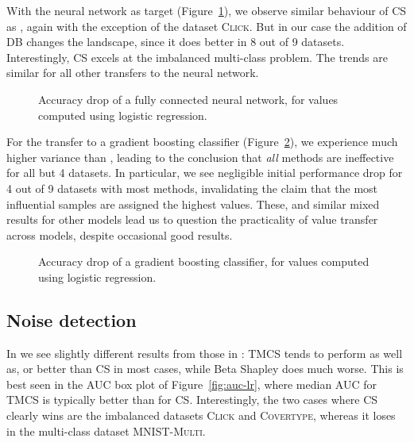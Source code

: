 \documentclass[10pt]{article}
\newcommand{\tmem}[1]{{\em #1\/}}
\newcommand{\tmname}[1]{\textsc{#1}}
\begin{document}
With the neural network as target (Figure~\ref{fig:transfer-lr-mlp}), we
observe similar behaviour of CS as {\cite{schoch_csshapley_2022}}, again with
the exception of the dataset {\tmname{Click}}. But in our case the addition of
DB changes the landscape, since it does better in 8 out of 9 datasets.
Interestingly, CS excels at the imbalanced multi-class problem. The trends are
similar for all other transfers to the neural network.

\begin{figure}[h]
  \caption{\label{fig:transfer-lr-mlp}Accuracy drop of a fully connected
  neural network, for values computed using logistic regression.}
\end{figure}

For the transfer to a gradient boosting classifier
(Figure~\ref{fig:transfer-lr-gb}), we experience much higher variance than
{\cite{schoch_csshapley_2022}}, leading to the conclusion that {\tmem{all}}
methods are ineffective for all but 4 datasets. In particular, we see
negligible initial performance drop for 4 out of 9 datasets with most methods,
invalidating the claim that the most influential samples are assigned the
highest values. These, and similar mixed results for other models lead us to
question the practicality of value transfer across models, despite occasional
good results.

\begin{figure}[h]
  \caption{\label{fig:transfer-lr-gb}Accuracy drop of a gradient boosting
  classifier, for values computed using logistic regression.}
\end{figure}

\subsection{Noise detection}\label{sec:noise-detection}

In  we see slightly different results from those
in {\cite{schoch_csshapley_2022}}: TMCS tends to perform as well as, or
better than CS in most cases, while Beta Shapley does much worse. This is best
seen in the AUC box plot of  Figure~\ref{fig:auc-lr}, where median AUC for
TMCS is typically better than for CS. Interestingly, the two cases where CS
clearly wins are the imbalanced datasets {\tmname{Click}} and
{\tmname{Covertype}}, whereas it loses in the multi-class dataset
{\tmname{MNIST-Multi}}.
\end{document}
